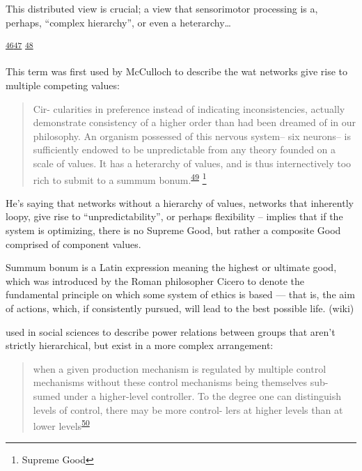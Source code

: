 \documentclass[
  a4paper,
]{article}
\begin{document}
This distributed view is crucial; a view that sensorimotor processing is
a, perhaps, ``complex hierarchy'', or even a heterarchy\ldots{}

\textsuperscript{\protect\hyperlink{ref-cohenRoleHeterarchicalControl1992}{46}}\textsuperscript{\protect\hyperlink{ref-huntDistributedHierarchicalRecurrent2017}{47}}
\textsuperscript{\protect\hyperlink{ref-huntHierarchicalCompetitionsSubserving2014}{48}}

This term was first used by McCulloch to describe the wat networks give
rise to multiple competing values:

\begin{quote}
Cir- cularities in preference instead of indicating inconsistencies,
actually demonstrate consistency of a higher order than had been dreamed
of in our philosophy. An organism possessed of this nervous system-- six
neurons-- is sufficiently endowed to be unpredictable from any theory
founded on a scale of values. It has a heterarchy of values, and is thus
internectively too rich to submit to a summum
bonum.\textsuperscript{\protect\hyperlink{ref-mccullochHeterarchyValuesDetermined1945}{49}}
\footnote{Supreme Good}
\end{quote}

He's saying that networks without a hierarchy of values, networks that
inherently loopy, give rise to ``unpredictability'', or perhaps
flexibility -- implies that if the system is optimizing, there is no
Supreme Good, but rather a composite Good comprised of component values.

Summum bonum is a Latin expression meaning the highest or ultimate good,
which was introduced by the Roman philosopher Cicero to denote the
fundamental principle on which some system of ethics is based --- that
is, the aim of actions, which, if consistently pursued, will lead to the
best possible life. (wiki)

used in social sciences to describe power relations between groups that
aren't strictly hierarchical, but exist in a more complex arrangement:

\begin{quote}
when a given production mechanism is regulated by multiple control
mechanisms without these control mechanisms being themselves sub- sumed
under a higher-level controller. To the degree one can distinguish
levels of control, there may be more control- lers at higher levels than
at lower
levels\textsuperscript{\protect\hyperlink{ref-crumleyHeterarchyAnalysisComplex2008}{50}}
\end{quote}
\end{document}
